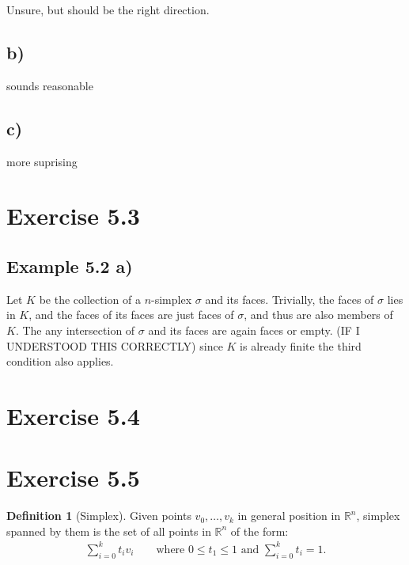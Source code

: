 \documentclass[a4paper]{book}
\theoremstyle{definition}
\newtheorem{definition}{Definition}[]
\begin{document}
Unsure, but should be the right direction.

\subsection*{b)}

sounds reasonable

\subsection*{c)}

more suprising

\section*{Exercise 5.3}

\subsection*{Example 5.2 a)}

Let \(K\) be the collection of a \(n\)-simplex \(\sigma\) and its faces. Trivially, the faces of \(\sigma\) lies in \(K\), and the faces of its faces are just faces of \(\sigma\), and thus are also members of \(K\). The any intersection of \(\sigma\) and its faces are again faces or empty. (IF I UNDERSTOOD THIS CORRECTLY) since \(K\) is already finite the third condition also applies.

\section*{Exercise 5.4}

\section*{Exercise 5.5}

\begin{defbox}
    \begin{definition}[Simplex]
        Given points \(v_0, \ldots, v_k\) in general position in \(\mathbb{R}^n\), simplex spanned by them is the set of all points in \(\mathbb{R}^n\) of the form:
        \begin{align*}
            \sum_{i=0}^k t_i v_i \qquad \text{where } 0 \leq t_1 \leq 1 \text{ and } \sum_{i=0}^k t_i = 1 \text{.} 
        \end{align*}
    \end{definition}
\end{defbox}
\end{document}
